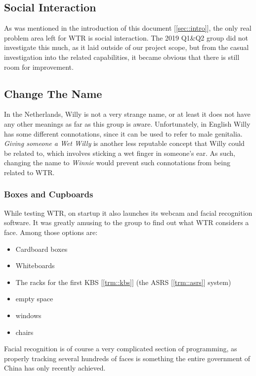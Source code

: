 \subsection{Social Interaction}
As was mentioned in the introduction of this document [\ref{sec::intro}], the only real problem area left for WTR is social interaction.
The 2019 Q1\&Q2 group did not investigate this much, as it laid outside of our project scope, but from the casual investigation into the related capabilities, it became obvious that there is still room for improvement.

\subsection{Change The Name}
In the Netherlands, Willy is not a very strange name, or at least it does not have any other meanings as far as this group is aware.
Unfortunately, in English Willy has some different connotations, since it can be used to refer to male genitalia.
\textit{Giving someone a Wet Willy} is another less reputable concept that Willy could be related to, which involves sticking a wet finger in someone's ear.
As such, changing the name to \textit{Winnie} would prevent such connotations from being related to WTR.

\subsubsection{Boxes and Cupboards}
While testing WTR, on startup it also launches its webcam and facial recognition software.
It was greatly amusing to the group to find out what WTR considers a face.
Among those options are:
\begin{itemize}
\item Cardboard boxes
\item Whiteboards
\item The racks for the first KBS [\ref{trm::kbs}] (the ASRS [\ref{trm::asrs}] system)
\item empty space
\item windows
\item chairs
\end{itemize}
Facial recognition is of course a very complicated section of programming, as properly tracking several hundreds of faces is something the entire government of China has only recently achieved.

